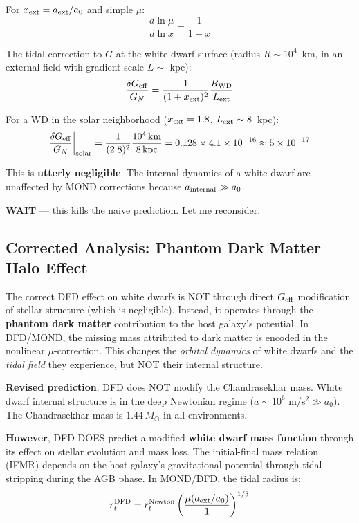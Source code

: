 \documentclass[11pt]{article}
\begin{document}
For $x_{\rm ext} = a_{\rm ext}/a_0$ and simple $\mu$:
\begin{equation}
\frac{d\ln\mu}{d\ln x} = \frac{1}{1+x}
\end{equation}

The tidal correction to $G$ at the white dwarf surface (radius $R \sim 10^4$~km,
in an external field with gradient scale $L \sim$ kpc):
\begin{equation}
\frac{\delta G_{\rm eff}}{G_N} = \frac{1}{(1+x_{\rm ext})^2}\frac{R_{\rm WD}}{L_{\rm ext}}
\end{equation}

For a WD in the solar neighborhood ($x_{\rm ext} = 1.8$, $L_{\rm ext} \sim 8$~kpc):
\begin{equation}
\frac{\delta G_{\rm eff}}{G_N}\bigg|_{\rm solar} = \frac{1}{(2.8)^2}\frac{10^4\,\text{km}}{8\,\text{kpc}}
= 0.128 \times 4.1 \times 10^{-16} \approx 5 \times 10^{-17}
\end{equation}

This is \textbf{utterly negligible}. The internal dynamics of a white dwarf
are unaffected by MOND corrections because $a_{\rm internal} \gg a_0$.

\textbf{WAIT} --- this kills the naive prediction. Let me reconsider.

\subsection{Corrected Analysis: Phantom Dark Matter Halo Effect}

The correct DFD effect on white dwarfs is NOT through direct $G_{\rm eff}$
modification of stellar structure (which is negligible). Instead, it operates
through the \textbf{phantom dark matter} contribution to the host galaxy's
potential. In DFD/MOND, the missing mass attributed to dark matter is encoded
in the nonlinear $\mu$-correction. This changes the \emph{orbital dynamics}
of white dwarfs and the \emph{tidal field} they experience, but NOT their
internal structure.

\textbf{Revised prediction}: DFD does NOT modify the Chandrasekhar mass.
White dwarf internal structure is in the deep Newtonian regime ($a \sim 10^6$
m/s$^2 \gg a_0$). The Chandrasekhar mass is $1.44\,M_\odot$ in all
environments.

\textbf{However}, DFD DOES predict a modified \textbf{white dwarf
mass function} through its effect on stellar evolution and mass loss.
The initial-final mass relation (IFMR) depends on the host galaxy's
gravitational potential through tidal stripping during the AGB phase.
In MOND/DFD, the tidal radius is:
\begin{equation}
r_t^{\rm DFD} = r_t^{\rm Newton}\left(\frac{\mu(a_{\rm ext}/a_0)}{1}\right)^{1/3}
\end{equation}
\end{document}
